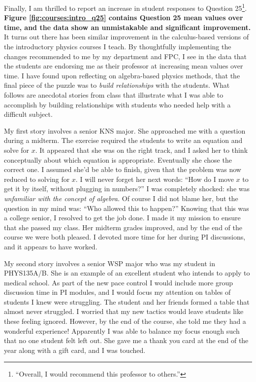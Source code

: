 \documentclass[../../main.tex]{subfiles}
\begin{document}
Finally, I am thrilled to report an increase in student responses to Question 25\footnote{``Overall, I would recommend this professor to others.''}. \textbf{Figure \ref{fig:courses:intro_q25} contains Question 25 mean values over time, and the data show an unmistakable and significant improvement.}  It turns out there has been similar improvement in the calculus-based versions of the introductory physics courses I teach.  By thoughtfully implementing the changes recommended to me by my department and FPC, I see in the data that the students are endorsing me as their professor at increasing mean values over time.  I have found upon reflecting on algebra-based physics methods, that the final piece of the puzzle was to \textit{build relationships} with the students.  What follows are anecdotal stories from class that illustrate what I was able to accomplish by building relationships with students who needed help with a difficult subject.  \\ \hspace{0.1cm}

My first story involves a senior KNS major.  She approached me with a question during a midterm.  The exercise required the students to write an equation and solve for $x$.  It appeared that she was on the right track, and I asked her to think conceptually about which equation is appropriate.  Eventually she chose the correct one.  I assumed she'd be able to finish, given that the problem was now reduced to solving for $x$.  I will never forget her next words: ``How do I move $x$ to get it by itself, without plugging in numbers?''  I was completely shocked: she was \textit{unfamiliar with the concept of algebra.}  Of course I did not blame her, but the question in my mind was: ``Who allowed this to happen?''  Knowing that this was a college senior, I resolved to get the job done.  I made it my mission to ensure that she passed my class.  Her midterm grades improved, and by the end of the course we were both pleased.  I devoted more time for her during PI discussions, and it appears to have worked.  \\ \hspace{0.1cm}

My second story involves a senior WSP major who was my student in PHYS135A/B.  She is an example of an excellent student who intends to apply to medical school.  As part of the new pace control I would include more group discussion time in PI modules, and I would focus my attention on tables of students I knew were struggling.  The student and her friends formed a table that almost never struggled.  I worried that my new tactics would leave students like these feeling ignored.  However, by the end of the course, she told me they had a wonderful experience!  Apparently I was able to balance my focus enough such that no one student felt left out.  She gave me a thank you card at the end of the year along with a gift card, and I was touched.  \\ \hspace{0.1cm}
\end{document}
